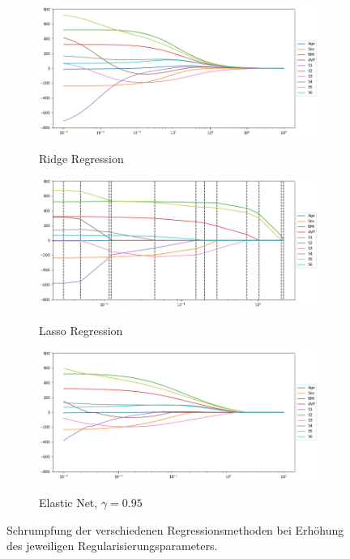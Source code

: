 \begin{figure}
\centering
	\begin{subfigure}{0.9\textwidth}
	\centering
	\includegraphics[width = \textwidth]{figures/ridge_regression_coefficients.png}
	\label{ridge_regression_coefficients}
	\vspace{-0.5cm}
	\caption{Ridge Regression}
	\vspace{0.5cm}
	\end{subfigure}
	\begin{subfigure}{0.9\textwidth}
	\centering
	\includegraphics[width = \textwidth]{figures/lasso_regression_coefficients.png}
	\label{lasso_regression_coefficients}
	\vspace{-0.5cm}
	\caption{Lasso Regression}
	\vspace{0.5cm}
	\end{subfigure}
	\begin{subfigure}{0.9\textwidth}
	\centering
	\includegraphics[width = \textwidth]{figures/elastic_net_coefficients.png}
	\label{elastic_net_coefficients}
	\vspace{-0.5cm}
	\caption{Elastic Net, $\gamma = 0.95$}
	\end{subfigure}
\caption{Schrumpfung der verschiedenen Regressionsmethoden bei Erhöhung des jeweiligen Regularisierungsparameters.}
\label{regression_coefficients}
\end{figure}

